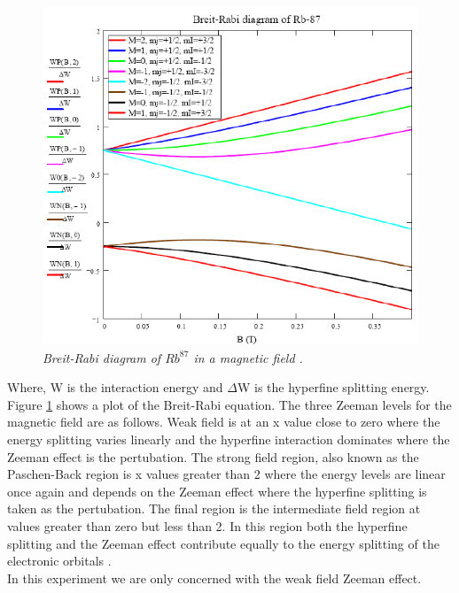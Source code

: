 \documentclass[twocolumn]{article}
\begin{document}
\begin{figure}
\begin{minipage}[t]{\textwidth}
\includegraphics[width=\linewidth]{pictures/breit-rabi.png}
\caption{\textit{Breit-Rabi diagram of $Rb^{87}$ in a magnetic field \cite{ref:3}.}}
\label{fig:7}
\end{minipage}
\end{figure}
Where, W is the interaction energy and $\Delta$W is the hyperfine splitting 
energy.
\\
Figure \ref{fig:7} shows a plot of the Breit-Rabi equation. The three Zeeman 
levels for the magnetic field are as follows. Weak field is at an x value close 
to zero where the energy splitting varies linearly and the hyperfine 
interaction dominates where the Zeeman effect is the pertubation. The strong 
field region, also known as the Paschen-Back region is x values greater than 2 
where the energy levels are linear once again and depends on the Zeeman effect 
where the hyperfine splitting is taken as the pertubation. The final region 
is the intermediate field region at values greater than zero but less than 2. 
In this region both the hyperfine splitting and the Zeeman effect contribute 
equally to the energy splitting of the electronic orbitals \cite{ref:4}.
\\
In this experiment we are only concerned with the weak field Zeeman effect.
\end{document}
